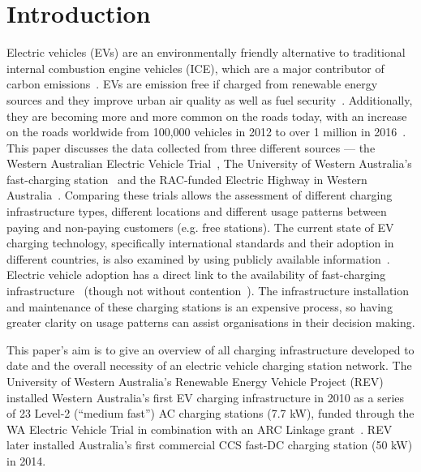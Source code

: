 \section{Introduction}
\label{sec:10:intro}
Electric vehicles (EVs) are an environmentally friendly alternative to traditional internal combustion engine vehicles (ICE), which are a major contributor of carbon emissions~\cite{department_of_infrastructure_and_regional_development_vehicle_2016}. EVs are emission free if charged from renewable energy sources and they improve urban air quality as well as fuel security~\cite{climateworks_australia_path_2016}. Additionally, they are becoming more and more common on the roads today, with an increase on the roads worldwide from 100,000 vehicles in 2012 to over 1 million in 2016~\cite{statista_worldwide_nodate}. This paper discusses the data collected from three different sources --- the Western Australian Electric Vehicle Trial~\cite{mader_western_2013}, The University of Western Australia’s fast-charging station~\cite{noauthor_electric_2017} and the RAC-funded Electric Highway in Western Australia~\cite{rac_wa_rac_nodate}. Comparing these trials allows the assessment of different charging infrastructure types, different locations and different usage patterns between paying and non-paying customers (e.g. free stations). The current state of EV charging technology,  specifically international standards and their adoption in different countries, is also examined by using publicly available information~\cite{plugshare_plugshare_nodate}. Electric vehicle adoption has a direct link to the availability of fast-charging infrastructure~\cite{gebauer_changing_2016} (though not without contention~\cite{bailey_is_2015}). The infrastructure installation and maintenance of these charging stations is an expensive process, so having greater clarity on usage patterns can assist organisations in their decision making.

This paper’s aim is to give an overview of all charging infrastructure developed to date and the overall necessity of an electric vehicle charging station network. The University of Western Australia's Renewable Energy Vehicle Project (REV) installed Western Australia's first EV charging infrastructure in 2010 as a series of 23 Level-2 (``medium fast'') AC charging stations (7.7 kW), funded through the WA Electric Vehicle Trial in combination with an ARC Linkage grant~\cite{mader_western_2013}. REV later installed Australia's first commercial CCS fast-DC charging station (50 kW) in 2014.

